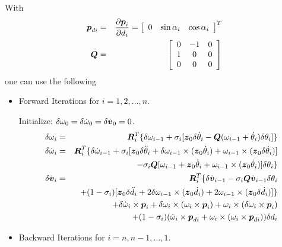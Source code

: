 With
\begin{eqnarray}
\mbold{p}_{di} & = & \dfdx{\mbold{p}_i}{d_i} = \matr{ccc}{ 0 & \sin \alpha_i & \cos \alpha_i}^T \\
\mbold{Q} & = & \matr{ccc}{
0 & -1 & 0  \\
1 & 0 & 0  \\
0 & 0 & 0 }
\end{eqnarray}
one can use the following
\begin{itemize}
\item Forward Iterations for $i=1, 2, \ldots, n$. 

Initialize: $\delta \omega_0 = \delta \dot{\omega}_0 = \delta \dot{\mbold{v}}_0 = 0$.
\begin{eqnarray}
\delta \omega_i & = & 
\mbold{R}_i^T \{\delta \omega_{i-1} + \sigma_i [ \mbold{z}_0 \delta \dot{\theta}_i 
- \mbold{Q}(\omega_{i-1} + \dot{\theta}_i ) \delta \theta_i ] \} \\
\delta \dot{\omega}_i & = & 
\mbold{R}_i^T  \{ \delta \dot{\omega}_{i-1} + 
\sigma_i [\mbold{z}_0 \delta \ddot{\theta}_i + \delta \omega_{i-1} \times (\mbold{z}_0 \dot{\theta}_i )
+ \omega_{i-1} \times (\mbold{z}_0 \delta \dot{\theta}_i )]  \nonumber \\
& & - \sigma_i \mbold{Q} [ \omega_{i-1} + \mbold{z}_0 \ddot{\theta}_i 
+ \omega_{i-1} \times (\mbold{z}_0 \dot{\theta}_i )] \delta \theta_i \} \\
\delta \dot{\mbold{v}}_i & = & 
\mbold{R}_i^T  \{ \delta \dot{\mbold{v}}_{i-1} 
- \sigma_i \mbold{Q} \dot{\mbold{v}}_{i-1} \delta \theta_i \nonumber \\
& & + (1 -\sigma_i) [\mbold{z}_0 \delta \ddot{d}_i 
+ 2 \delta \omega_{i-1} \times (\mbold{z}_0 \dot{d}_i ) 
+ 2 \omega_{i-1} \times (\mbold{z}_0 \delta \dot{d}_i )] \} 
\nonumber \\ 
& & + \delta \dot{\omega}_i \times \mbold{p}_i 
+ \delta \omega_i \times ( \omega_i \times \mbold{p}_i) 
+ \omega_i \times ( \delta \omega_i \times \mbold{p}_i) \nonumber \\
& & + (1 - \sigma_i) (\dot{\omega}_i \times \mbold{p}_{di} 
+ \omega_i \times ( \omega_i \times \mbold{p}_{di}) ) \delta d_i
\end{eqnarray}

\item Backward Iterations for $i=n, n-1, \ldots, 1$. 


\end{itemize}
